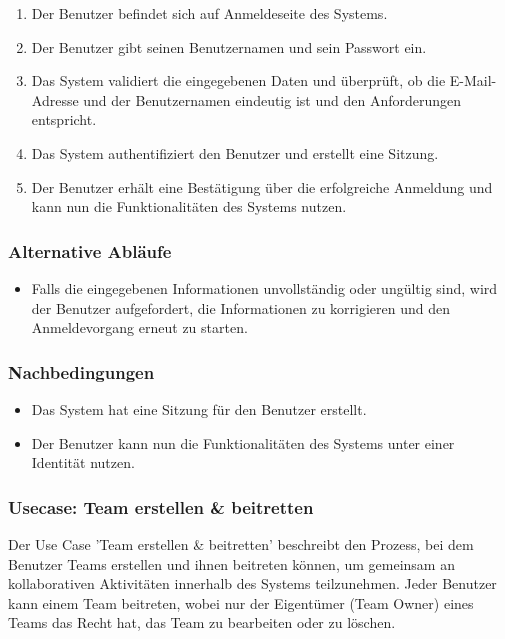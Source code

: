 \begin{enumerate}
  \item Der Benutzer befindet sich auf Anmeldeseite des Systems.
  \item Der Benutzer gibt seinen Benutzernamen und sein Passwort ein.
  \item Das System validiert die eingegebenen Daten und überprüft, ob die E-Mail-Adresse und der Benutzernamen eindeutig ist und den Anforderungen entspricht.
  \item Das System authentifiziert den Benutzer und erstellt eine Sitzung.
  \item Der Benutzer erhält eine Bestätigung über die erfolgreiche Anmeldung und kann nun die Funktionalitäten des Systems nutzen.
\end{enumerate}

\subsubsection*{Alternative Abläufe}

\begin{itemize}
  \item Falls die eingegebenen Informationen unvollständig oder ungültig sind, wird der Benutzer aufgefordert, die Informationen zu korrigieren
   und den Anmeldevorgang erneut zu starten.
\end{itemize}

\subsubsection*{Nachbedingungen}

\begin{itemize}
  \item Das System hat eine Sitzung für den Benutzer erstellt.
  \item Der Benutzer kann nun die Funktionalitäten des Systems unter einer Identität nutzen.
\end{itemize}

\subsubsection{Usecase: Team erstellen \& beitretten}

Der Use Case 'Team erstellen \& beitretten' beschreibt den Prozess, bei dem Benutzer Teams erstellen und ihnen beitreten können, um gemeinsam an 
kollaborativen Aktivitäten innerhalb des Systems teilzunehmen. Jeder Benutzer kann einem Team beitreten, wobei nur der Eigentümer (Team Owner) eines 
Teams das Recht hat, das Team zu bearbeiten oder zu löschen.

